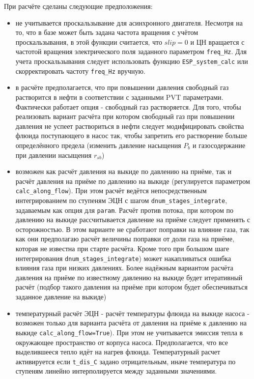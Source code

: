 При расчёте сделаны следующие предположения:
\begin{itemize}
	\item не учитывается проскальзывание для асинхронного двигателя. Несмотря на то, что в базе может быть задана частота вращения с учётом проскальзывания, в этой функции считается, что \(slip = 0\) и ЦН вращается с частотой вращения электрического поля заданного параметром \texttt{freq_Hz}. Для учета проскальзывания следует использовать функцию \texttt{ESP_system_calc} или скорректировать частоту \texttt{freq_Hz} вручную.
	\item в расчёте предполагается, что при повышении давления свободный газ растворится в нефти в соответствии с заданными PVT параметрами. Фактически работает опция - свободный газ растворяется. Для того, чтобы реализовать вариант расчёта при котором свободный газ при повышении давления не успеет раствориться в нефти следует модифицировать свойства флюида поступающего в насос так, чтобы запретить его растворение больше определённого предела (изменить давление насыщения $P_b$ и газосодержание при давлении насыщения $r_{sb}$)
	\item возможен как расчёт давления на выкиде по давлению на приёме, так и расчёт давления на приёме по давлению на выкиде (регулируется параметром \texttt{calc_along_flow}). При этом расчёт ведётся непосредственным интегрированием по ступеням ЭЦН с шагом \texttt{dnum_stages_integrate}, задаваемым как опция для \texttt{param}. Расчёт против потока, при котором по давлению на выкиде рассчитывается давление на приёме следует применять с осторожностью. В этом варианте не сработают поправки на влияние газа, так как они предполагаю расчёт величины поправки от доли газа на приёме, которая не известна при старте расчёта. Кроме того при большом шаге интегрирования \texttt{dnum_stages_integrate}) может накапливаться ошибка влияния газа при низких давлениях. Более надёжным вариантом расчёта давления на приёме по известному давлению на выкиде будет итеративный расчёт (подбор такого давления на приёме при котором будет обеспечиваться заданное давление на выкиде)
	\item температурный расчёт ЭЦН - расчёт температуры флюида на выкиде насоса - возможен только для варианта расчёта от давления на приёме к давлению на выкиде  \texttt{calc_along_flow=True}). При этом не учитывается эмиссия тепла в окружающее пространство от корпуса насоса. Предполагается, что все выделившееся тепло идёт на нагрев флюида. Температурный расчет активируется если \texttt{t_dis_C} задано отрицательным, иначе температура по ступеням линейно интерполируется между заданными значениями.
	
\end{itemize}

